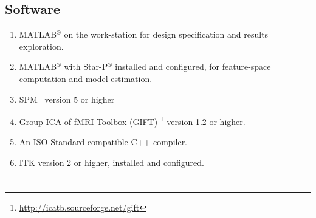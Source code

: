 \documentclass[12pt,twoside]{article}
\renewcommand{\cite}[1]{{\color{blue}\citep{#1}}}
\newcommand{\HMM}{{\color{darkred}\textbf{\textsf{HMM\ }}}}
\begin{document}
\subsection{Software}
\begin{enumerate}
  \item MATLAB$^\circledR$ on the work-station for design
  specification and results exploration.
  \item MATLAB$^\circledR$ with Star-P$^\circledR$ installed and
  configured, for feature-space computation and model estimation.
  \item SPM~\cite{TheFILMethodsGroup2011} version 5 or higher
  \item Group ICA of fMRI Toolbox (GIFT) \footnote{\url{http://icatb.sourceforge.net/gift}} version 1.2 or higher.
  \item An ISO Standard compatible C++ compiler.
  \item ITK\cite{Ibanez2003} version 2 or higher, installed and configured.
\end{enumerate}














\newpage








\enlargethispage{13mm}

\vspace*{-6mm}


\section*{\scalebox{2}{\Huge{{\color{studyblue}Manual\,:} \HMM}}}

\vspace{4mm}
\end{document}
